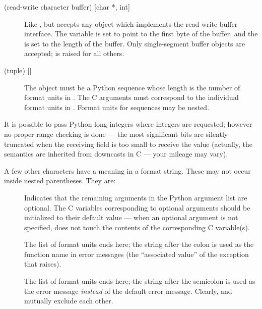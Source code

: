 \begin{description}
\item[ (read-write character buffer) {[char *, int]}]
Like , but accepts any object which implements the
read-write buffer interface.  The  variable is set to
point to the first byte of the buffer, and the  is set to
the length of the buffer.  Only single-segment buffer objects are
accepted;  is raised for all others.

\item[ (tuple) {[]}]
The object must be a Python sequence whose length is the number of
format units in .  The C arguments must correspond to the
individual format units in .  Format units for sequences
may be nested.


\end{description}

It is possible to pass Python long integers where integers are
requested; however no proper range checking is done --- the most
significant bits are silently truncated when the receiving field is
too small to receive the value (actually, the semantics are inherited
from downcasts in C --- your mileage may vary).

A few other characters have a meaning in a format string.  These may
not occur inside nested parentheses.  They are:

\begin{description}

\item[\samp{|}]
Indicates that the remaining arguments in the Python argument list are
optional.  The C variables corresponding to optional arguments should
be initialized to their default value --- when an optional argument is
not specified,  does not touch the contents
of the corresponding C variable(s).

\item[\samp{:}]
The list of format units ends here; the string after the colon is used
as the function name in error messages (the ``associated value'' of
the exception that  raises).

\item[\samp{;}]
The list of format units ends here; the string after the semicolon is
used as the error message \emph{instead} of the default error message.
Clearly, \samp{:} and \samp{;} mutually exclude each other.

\end{description}

